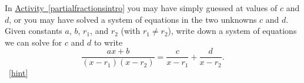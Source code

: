 \documentclass{book}
\begin{document}
\setcounter{project}{265}
\addtocounter{project}{-1}
\begin{activity}[]\label{partialfractions1}
\hypertarget{p-1411}{}%
In \hyperref[partialfractionsintro]{Activity~\ref{partialfractionsintro}} you may have simply guessed at values of \(c\) and \(d\), or you may have solved a system of equations in the two unknowns \(c\) and \(d\). Given constants \(a\), \(b\), \(r_1\), and \(r_2\) (with \(r_1\not= r_2\)), write down a system of equations we can solve for \(c\) and \(d\) to write%
\begin{equation*}
\frac{ax+b}{(x-r_1)(x-r_2)} = \frac{c}{x-r_1} + \frac{d}{x-r_2}\text{.}
\end{equation*}
%
~\hfill{\tiny\hyperlink{a-265}{[hint]}\hypertarget{q-265}{}}\end{activity}
\end{document}
